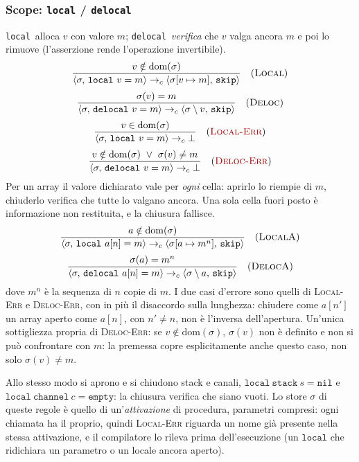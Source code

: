 \subsubsection{Scope: \texttt{local} / \texttt{delocal}}
\label{sec:scope}
\texttt{local}\ alloca $v$ con valore $m$; \texttt{delocal}\ \emph{verifica} che
$v$ valga ancora $m$ e poi lo rimuove (l'asserzione rende l'operazione
invertibile).
\[
\dfrac{v \notin \mathrm{dom}(\sigma)}
      {\cfg{\mathtt{local}\ v = m}{\sigma} \toc \cfg{\mathtt{skip}}{\upd{\sigma}{v}{m}}} \rname{Local}
\]
\[
\dfrac{\sigma(v) = m}
      {\cfg{\mathtt{delocal}\ v = m}{\sigma} \toc \cfg{\mathtt{skip}}{\sigma \setminus v}} \rname{Deloc}
\]
\[
\dfrac{v \in \mathrm{dom}(\sigma)}
      {\cfg{\mathtt{local}\ v = m}{\sigma} \toc \err} \rnameerr{Local-Err}
\]
\[
\dfrac{v \notin \mathrm{dom}(\sigma) \ \lor\ \sigma(v) \neq m}
      {\cfg{\mathtt{delocal}\ v = m}{\sigma} \toc \err} \rnameerr{Deloc-Err}
\]
Per un array il valore dichiarato vale per \emph{ogni} cella: aprirlo lo
riempie di $m$, chiuderlo verifica che tutte lo valgano ancora. Una sola cella
fuori posto è informazione non restituita, e la chiusura fallisce.
\[
\dfrac{a \notin \mathrm{dom}(\sigma)}
      {\cfg{\mathtt{local}\ a[n] = m}{\sigma} \toc \cfg{\mathtt{skip}}{\upd{\sigma}{a}{m^{n}}}} \rname{LocalA}
\]
\[
\dfrac{\sigma(a) = m^{n}}
      {\cfg{\mathtt{delocal}\ a[n] = m}{\sigma} \toc \cfg{\mathtt{skip}}{\sigma \setminus a}} \rname{DelocA}
\]
dove $m^{n}$ è la sequenza di $n$ copie di $m$. I due casi d'errore sono quelli
di \textsc{Local-Err} e \textsc{Deloc-Err}, con in più il disaccordo sulla
lunghezza: chiudere come $a[n']$ un array aperto come $a[n]$, con $n' \neq n$,
non è l'inversa dell'apertura.
Un'unica
sottigliezza propria di \textcolor{red!60!black}{\textsc{Deloc-Err}}: se $v \notin \mathrm{dom}(\sigma)$,
$\sigma(v)$ non è definito e non si può confrontare con $m$: la premessa
copre esplicitamente anche questo caso, non solo $\sigma(v) \neq m$.

Allo stesso modo si aprono e si chiudono stack e canali,
$\mathtt{local}\ \mathtt{stack}\ s = \mathtt{nil}$ e
$\mathtt{local}\ \mathtt{channel}\ c = \mathtt{empty}$: la chiusura verifica
che siano vuoti. Lo store $\sigma$ di queste regole è quello di
un'\emph{attivazione} di procedura, parametri compresi: ogni chiamata ha il
proprio, quindi \textsc{Local-Err} riguarda un nome già presente nella stessa
attivazione, e il compilatore lo rileva prima dell'esecuzione (un
$\mathtt{local}$ che ridichiara un parametro o un locale ancora aperto).

